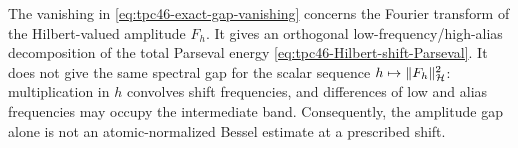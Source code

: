 \begin{remark}
\label{rem:tpc46-amplitude-energy-distinction}
The vanishing in \eqref{eq:tpc46-exact-gap-vanishing} concerns the
Fourier transform of the Hilbert-valued amplitude \(F_h\).  It gives an
orthogonal low-frequency/high-alias decomposition of the total
Parseval energy \eqref{eq:tpc46-Hilbert-shift-Parseval}.  It does not
give the same spectral gap for the scalar sequence
\(h\mapsto\|F_h\|_{\mathcal H}^2\): multiplication in \(h\) convolves shift
frequencies, and differences of low and alias frequencies may occupy
the intermediate band.  Consequently, the amplitude gap alone is not
an atomic-normalized Bessel estimate at a prescribed shift.
\end{remark}
